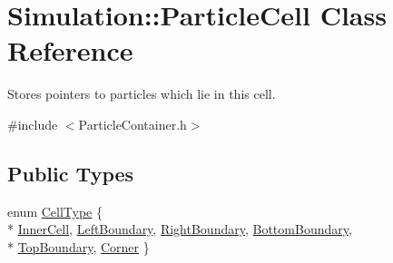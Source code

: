 \hypertarget{classSimulation_1_1ParticleCell}{\section{Simulation\-:\-:Particle\-Cell Class Reference}
\label{classSimulation_1_1ParticleCell}
}


Stores pointers to particles which lie in this cell.  




{\ttfamily \#include $<$Particle\-Container.\-h$>$}

\subsection*{Public Types}
\begin{DoxyCompactItemize}
\item 
enum \hyperlink{classSimulation_1_1ParticleCell_a2212779392dcf6befecc55da1ec5356c}{Cell\-Type} \{ \\*
\hyperlink{classSimulation_1_1ParticleCell_a2212779392dcf6befecc55da1ec5356caa37d40bf1097ce2043342c9a4d52182b}{Inner\-Cell}, 
\hyperlink{classSimulation_1_1ParticleCell_a2212779392dcf6befecc55da1ec5356ca9b7b3132a0d07ce3c1ec88e586bf2eb0}{Left\-Boundary}, 
\hyperlink{classSimulation_1_1ParticleCell_a2212779392dcf6befecc55da1ec5356ca424b56d6cea2bc492efd833bd3b07cdb}{Right\-Boundary}, 
\hyperlink{classSimulation_1_1ParticleCell_a2212779392dcf6befecc55da1ec5356ca10c2e4dddb9ca58b6b4526d5996ad288}{Bottom\-Boundary}, 
\\*
\hyperlink{classSimulation_1_1ParticleCell_a2212779392dcf6befecc55da1ec5356ca10d23b8bf6686ae323d3af3dcb61c368}{Top\-Boundary}, 
\hyperlink{classSimulation_1_1ParticleCell_a2212779392dcf6befecc55da1ec5356cac0b8b9d11a7514e08bf149a2246ceb7f}{Corner}
 \}
\end{DoxyCompactItemize}
